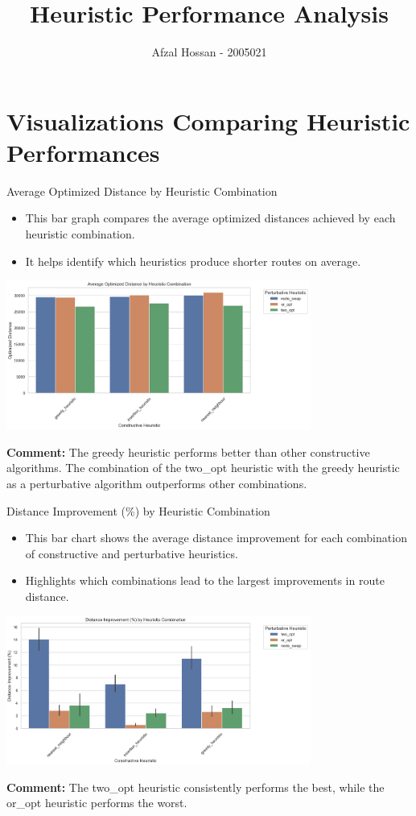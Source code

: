 \documentclass[presentation]{beamer}
\title{Heuristic Performance Analysis}
\author{Afzal Hossan - 2005021}
\date{}
\begin{document}
\frame{\titlepage}

\section{Visualizations Comparing Heuristic Performances}

\begin{frame}{Average Optimized Distance by Heuristic Combination}
\begin{itemize}
    \item This bar graph compares the average optimized distances achieved by each heuristic combination.
    \item It helps identify which heuristics produce shorter routes on average.
\end{itemize}
\begin{center}
\includegraphics[width=0.75\textwidth]{average_distance_chart.png}\\
\end{center}
\textbf{Comment:} The greedy heuristic performs better than other constructive algorithms. The combination of the two\_opt heuristic with the greedy heuristic as a perturbative algorithm outperforms other combinations.
\end{frame}

\begin{frame}{Distance Improvement (\%) by Heuristic Combination}
\begin{itemize}
    \item This bar chart shows the average distance improvement for each combination of constructive and perturbative heuristics.
    \item Highlights which combinations lead to the largest improvements in route distance.
\end{itemize}
\begin{center}
\includegraphics[width=0.75\textwidth]{distance_improvement_chart.png}\\
\end{center}
\textbf{Comment:} The two\_opt heuristic consistently performs the best, while the or\_opt heuristic performs the worst.
\end{frame}
\end{document}

